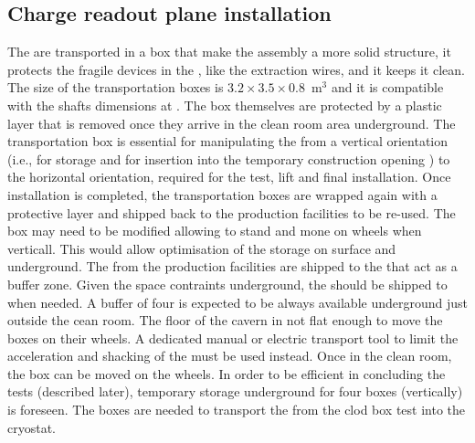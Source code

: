 \subsection{Charge readout plane installation}
The  are transported in a box that make the  assembly a more solid structure, it protects the fragile devices in the , like the extraction wires, and it keeps it clean.
The size of the transportation boxes is $3.2\times3.5\times0.8$~m$^3$ and it is compatible with the shafts dimensions at .
The box themselves are protected by a plastic layer that is removed once they arrive in the clean room area underground.
The transportation box is essential for manipulating the  from a vertical orientation (i.e., for storage and for insertion into the temporary construction opening ) to the horizontal orientation, required for the  \coldbox test, lift and final installation.
Once installation is completed, the transportation boxes are wrapped again with a protective layer and shipped back to the production facilities to be re-used.
The  box may need to be modified allowing to stand and mone on wheels when verticall.
This would allow optimisation of the storage on surface and underground.
The  from the production facilities are shipped to the  that act as a buffer zone.
Given the space contraints underground, the  should be shipped to  when needed.
A buffer of four  is expected to be always available underground just outside the cean room.
The floor of the cavern in not flat enough to move the  boxes on their wheels.
A dedicated manual or electric transport tool to limit the acceleration and shacking of the  must be used instead.
Once in the clean room, the box can be moved on the wheels.
In order to be efficient in concluding the  \coldbox tests (described later), temporary storage underground for four boxes (vertically) is foreseen.
The boxes are needed to transport the  from the clod box test into the cryostat.


